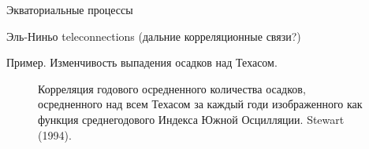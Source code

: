 \begin{chapter}{Экваториальные процессы}
\begin{section}{Эль-Ниньо teleconnections (дальние корреляционные связи?)}
\begin{paragraph}{Пример. Изменчивость выпадения осадков над Техасом.}
\begin{figure}[t!]
\begin{centering}
\end{centering}
\caption{Корреляция годового осредненного количества осадков, осредненного над всем Техасом за каждый годи изображенного как функция среднегодового Индекса Южной Осцилляции. Stewart (1994).}
\label{fig:texasrain}
\end{figure}
%
%
\end{paragraph}
\end{section}


\end{chapter}
